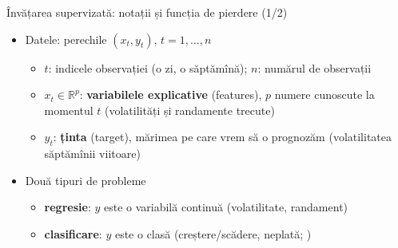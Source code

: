 \begin{frame}{Învățarea supervizată: notații și funcția de pierdere (1/2)}
\itemsize{\small}
\begin{itemize}
    \item Datele: perechile $(x_t, y_t)$, $t = 1, \dots, n$
    \begin{itemize}
        \item $t$: indicele observației (o zi, o săptămînă); $n$: numărul de observații
        \item $x_t \in \mathbb{R}^p$: \textbf{variabilele explicative} (features), $p$ numere cunoscute la momentul $t$ (volatilități și randamente trecute)
        \item $y_t$: \textbf{ținta} (target), mărimea pe care vrem să o prognozăm (volatilitatea săptămînii viitoare)
    \end{itemize}
    \item Două tipuri de probleme
    \begin{itemize}
        \item \textbf{regresie}: $y$ este o variabilă continuă (volatilitate, randament)
        \item \textbf{clasificare}: $y$ este o clasă (creștere/scădere, neplată; )
    \end{itemize}
\end{itemize}
\end{frame}

